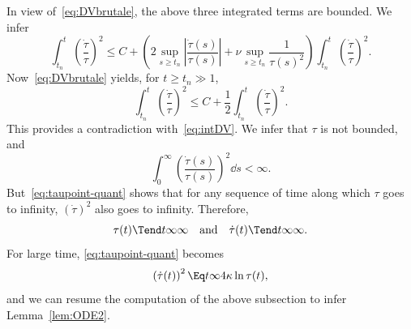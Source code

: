 In view of~\eqref{eq:DVbrutale}, the above three integrated terms are bounded. We infer
\begin{equation*}
\int_{t_n}^t \left(\frac{\dot \tau}{\tau}\right)^2 \le C + \left(2\sup_{s\ge t_n}\left| \frac{\dot \tau(s)}{\tau(s)}\right| +\nu\sup_{s\ge t_n}\frac{1}{\tau(s)^2}\right) \int_{t_n}^t \left(\frac{\dot
\tau}{\tau}\right)^2.
\end{equation*}
Now~\eqref{eq:DVbrutale} yields, for $t\ge t_n\gg 1$,
\begin{equation*}
\int_{t_n}^t \left(\frac{\dot \tau}{\tau}\right)^2 \le C + \frac{1}{2} \int_{t_n}^t \left(\frac{\dot
\tau}{\tau}\right)^2.
\end{equation*}
This provides a contradiction with~\eqref{eq:intDV}. We infer that $\tau$ is not bounded, and
\begin{equation*}
\int_0^\infty\left(\frac{\dot \tau(s)}{\tau(s)}\right)^2\dd s<\infty.
\end{equation*}
But~\eqref{eq:taupoint-quant} shows that for any sequence of time along which $\tau$ goes to infinity, $(\dot \tau)^2$ also goes to infinity. Therefore,
\begin{equation*}
\tau(t)\Tend t \infty \infty\quad\text{and}\quad \dot\tau(t)\Tend t \infty \infty.
\end{equation*}
For large time, \eqref{eq:taupoint-quant} becomes
\begin{equation*}
\left(\dot \tau(t)\right)^2 \Eq t \infty 4\kappa \ln \tau(t),
\end{equation*}
and we can resume the computation of the above subsection to infer Lemma~\ref{lem:ODE2}.



